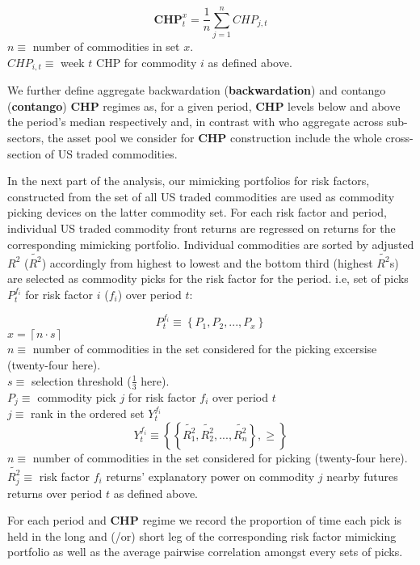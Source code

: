 \documentclass[12pt,]{article}
\begin{document}
\[\mathbf{CHP}_{t}^{x}=\frac{1}{n}\sum_{j=1}^{n}CHP_{j,t}\] \(n\equiv\)
number of commodities in set \(x\).\\
\(CHP_{i,t}\equiv\) week \(t\) CHP for commodity \(i\) as defined above.

We further define aggregate backwardation (\textbf{backwardation}) and
contango (\textbf{contango}) \textbf{CHP} regimes as, for a given
period, \textbf{CHP} levels below and above the period's median
respectively and, in contrast with \citep{hong_what_2012} who aggregate
across sub-sectors, the asset pool we consider for \textbf{CHP}
construction include the whole cross-section of US traded commodities.

In the next part of the analysis, our mimicking portfolios for risk
factors, constructed from the set of all US traded commodities are used
as commodity picking devices on the latter commodity set. For each risk
factor and period, individual US traded commodity front returns are
regressed on returns for the corresponding mimicking portfolio.
Individual commodities are sorted by adjusted \(R^{2}\)
(\(\tilde{R^{2}}\)) accordingly from highest to lowest and the bottom
third (highest \(\tilde{R^{2}}\)s) are selected as commodity picks for
the risk factor for the period. i.e, set of picks \(P_{t}^{f_{i}}\) for
risk factor \(i\) (\(f_{i}\)) over period \(t\):

\[P_{t}^{f_{i}}\equiv\left \{ P_{1}, P_{2}, ..., P_{x} \right \}\]
\(x = \left \lceil n \cdot s \right \rceil\)\\
\(n\equiv\) number of commodities in the set considered for the picking
excersise (twenty-four here).\\
\(s\equiv\) selection threshold (\(\frac{1}{3}\) here).\\
\(P_{j}\equiv\) commodity pick \(j\) for risk factor \(f_{i}\) over
period \(t\)\\
\(j\equiv\) rank in the ordered set \(Y_{t}^{f_{i}}\)\\
\[Y_{t}^{f_{i}}\equiv\left \{ \left \{ \tilde{R_{1}^{2}}, \tilde{R_{2}^{2}}, ..., \tilde{R_{n}^{2}} \right \}, \geq \right \}\]
\(n\equiv\) number of commodities in the set considered for picking
(twenty-four here).\\
\(\tilde{R_{j}^{2}}\equiv\) risk factor \(f_{i}\) returns' explanatory
power on commodity \(j\) nearby futures returns over period \(t\) as
defined above.

For each period and \textbf{CHP} regime we record the proportion of time
each pick is held in the long and (/or) short leg of the corresponding
risk factor mimicking portfolio as well as the average pairwise
correlation amongst every sets of picks.
\end{document}

